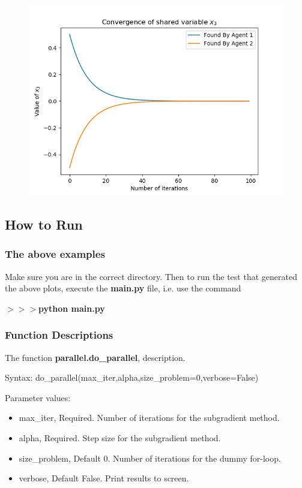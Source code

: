 \documentclass[12pt]{article}
\begin{document}
\begin{figure}[H]
	\includegraphics[scale=1]{Problem1-Convergence.png}
\end{figure}

\subsection*{How to Run}

\subsubsection*{The above examples}

Make sure you are in the correct directory. Then to run the test that generated the above plots, execute the \textbf{main.py} file, i.e. use the command

\noindent \textbf{$>>>$python main.py}

\subsubsection*{Function Descriptions}

The function \textbf{parallel.do\_parallel}, description.

Syntax: do\_parallel(max\_iter,alpha,size\_problem=0,verbose=False)

Parameter values:
\begin{itemize}
	\item max\_iter, Required. Number of iterations for the subgradient method.
	\item alpha, Required. Step size for the subgradient method.
	\item size\_problem, Default 0. Number of iterations for the dummy for-loop.
	\item verbose, Default False. Print results to screen.
\end{itemize}
\end{document}
